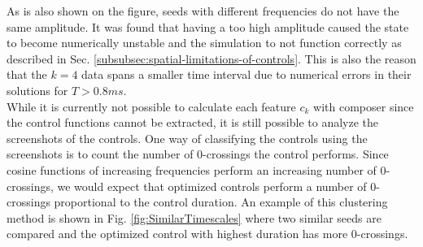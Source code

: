 \documentclass[a4paper, twocolumn]{revtex4-1}
\begin{document}
As is also shown on the figure, seeds with different frequencies do not have the same amplitude. It was found that having a too high amplitude caused the state to become numerically unstable and the simulation to not function correctly as described in Sec. \ref{subsubsec:spatial-limitations-of-controls}. This is also the reason that the $k=4$ data spans a smaller time interval due to numerical errors in their solutions for $T>0.8 ms$. \\

While it is currently not possible to calculate each feature $c_k$ with composer since the control functions cannot be extracted, it is still possible to analyze the screenshots of the controls. One way of classifying the controls using the screenshots is to count the number of 0-crossings the control performs. Since cosine functions of increasing frequencies perform an increasing number of 0-crossings, we would expect that optimized controls perform a number of 0-crossings proportional to the control duration. An example of this clustering method is shown in Fig. \ref{fig:SimilarTimescales} where two similar seeds are compared and the optimized control with highest duration has more 0-crossings.
\end{document}
